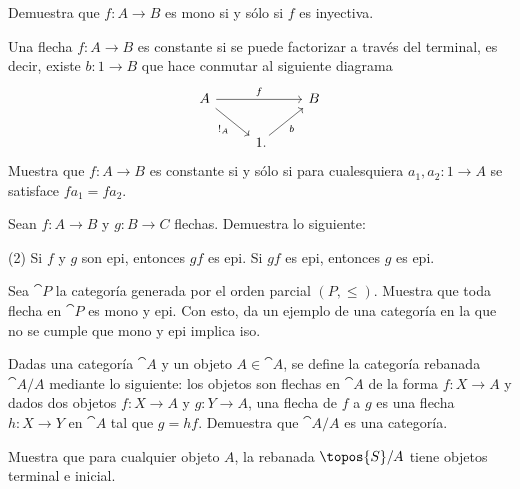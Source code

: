 
\begin{exercise}[teca=1]
  Demuestra que \(f\colon A\to B\) es mono si y sólo si \(f\) es 
  inyectiva.
\end{exercise}

\begin{exercise}
  Una flecha \(f\colon A\to B\) es constante si se puede factorizar a
  través del terminal, es decir, existe \(b\colon 1\to B\) que hace
  conmutar al siguiente diagrama
  \begin{equation*}
      \begin{tikzcd}[ampersand replacement=\&] 
          A\ar{rr}{f}\ar{dr}[swap]{!_A} \&\& B\\
          \& 1\mathrlap{.}\ar{ur}[swap]{b}
      \end{tikzcd}
  \end{equation*}
  Muestra que \(f\colon A\to B\) es constante si y sólo si para
  cualesquiera \(a_1,a_2\colon 1\to A\) se satisface \(fa_1 = fa_2\).
\end{exercise}

\begin{exercise}
  Sean \(f\colon A\to B\) y \(g\colon B\to C\) flechas. Demuestra lo
  siguiente:
  \begin{tasks}(2)
      \task Si \(f\) y \(g\) son epi, entonces \(gf\) es epi.
      \task Si \(gf\) es epi, entonces \(g\) es epi.
  \end{tasks}
\end{exercise}

\begin{exercise}
  Sea \(\cat{P}\) la categoría generada por el orden parcial \((P,\leq)\).
  Muestra que toda flecha en \(\cat{P}\) es mono y epi. Con esto, da un
  ejemplo de una categoría en la que no se cumple que mono y epi implica iso.
\end{exercise}

\begin{exercise}
  Dadas una categoría \(\cat{A}\) y un objeto \(A\in\cat{A}\), se define
  la categoría rebanada  \(\cat{A}/A\) mediante lo siguiente: los objetos
  son flechas en \(\cat{A}\) de la forma \(f\colon X\to A\) y dados
  dos objetos \(f\colon X\to A\) y \(g\colon Y\to A\), una flecha de
  \(f\) a \(g\) es una flecha \(h\colon X\to Y\) en \(\cat{A}\) tal que
  \(g = hf\). Demuestra que \(\cat{A}/A\) es una categoría.
\end{exercise}

\begin{exercise}
  Muestra que para cualquier objeto \(A\), la rebanada \(\topos{S}/A\)
  tiene objetos terminal e inicial.
\end{exercise}

